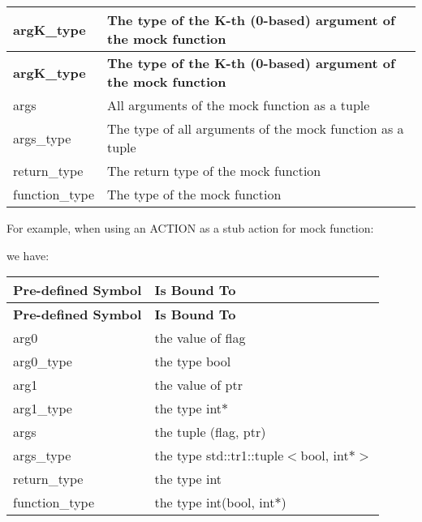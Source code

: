 \tabulinesep=1mm
\begin{longtabu}spread 0pt [c]{*{2}{|X[-1]}|}
\hline
\cellcolor{\tableheadbgcolor}\textbf{ {\ttfamily arg\+K\+\_\+type}  }&\cellcolor{\tableheadbgcolor}\textbf{ The type of the K-\/th (0-\/based) argument of the mock function   }\\
\endfirsthead
\hline
\endfoot
\hline
\cellcolor{\tableheadbgcolor}\textbf{ {\ttfamily arg\+K\+\_\+type}  }&\cellcolor{\tableheadbgcolor}\textbf{ The type of the K-\/th (0-\/based) argument of the mock function   }\\
\endhead
{\ttfamily args}  &All arguments of the mock function as a tuple   \\
{\ttfamily args\+\_\+type}  &The type of all arguments of the mock function as a tuple   \\
{\ttfamily return\+\_\+type}  &The return type of the mock function   \\
{\ttfamily function\+\_\+type}  &The type of the mock function   \\
\end{longtabu}


For example, when using an {\ttfamily A\+C\+T\+I\+ON} as a stub action for mock function\+: 
\begin{DoxyCode}{0}
\end{DoxyCode}
 we have\+: \tabulinesep=1mm
\begin{longtabu}spread 0pt [c]{*{2}{|X[-1]}|}
\hline
\cellcolor{\tableheadbgcolor}\textbf{ {\bfseries Pre-\/defined Symbol}  }&\cellcolor{\tableheadbgcolor}\textbf{ {\bfseries Is Bound To}   }\\
\endfirsthead
\hline
\endfoot
\hline
\cellcolor{\tableheadbgcolor}\textbf{ {\bfseries Pre-\/defined Symbol}  }&\cellcolor{\tableheadbgcolor}\textbf{ {\bfseries Is Bound To}   }\\
\endhead
{\ttfamily arg0}  &the value of {\ttfamily flag}   \\
{\ttfamily arg0\+\_\+type}  &the type {\ttfamily bool}   \\
{\ttfamily arg1}  &the value of {\ttfamily ptr}   \\
{\ttfamily arg1\+\_\+type}  &the type {\ttfamily int$\ast$}   \\
{\ttfamily args}  &the tuple {\ttfamily (flag, ptr)}   \\
{\ttfamily args\+\_\+type}  &the type {\ttfamily std\+::tr1\+::tuple$<$bool, int$\ast$$>$}   \\
{\ttfamily return\+\_\+type}  &the type {\ttfamily int}   \\
{\ttfamily function\+\_\+type}  &the type {\ttfamily int(bool, int$\ast$)}   \\
\end{longtabu}


